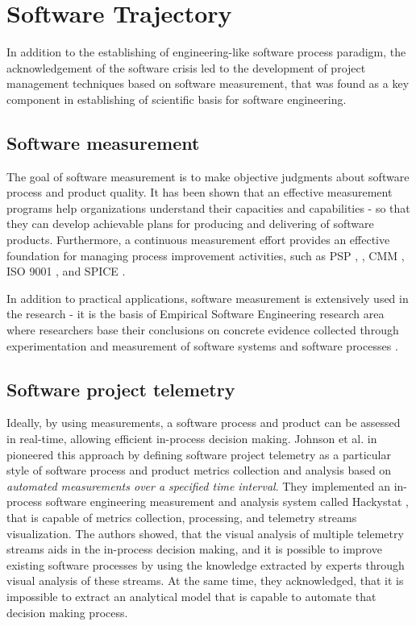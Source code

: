 %
%
\section{Software Trajectory}\label{sec_software_trajectory}
In addition to the establishing of engineering-like software process paradigm, the acknowledgement of 
the software crisis led to the development of project management techniques based on software measurement, 
that was found as a key component in establishing of scientific basis for software engineering.

\subsection{Software measurement}\label{sec_software_metrics}
The goal of software measurement is to make objective judgments about software process and product quality. 
It has been shown that an effective measurement programs help organizations understand their capacities and 
capabilities - so that they can develop achievable plans for producing and delivering of software products. 
Furthermore, a continuous measurement effort provides an effective foundation for managing process 
improvement activities, such as PSP \cite{citeulike:8347315}, \cite{citeulike:5090131} 
\cite{citeulike:12929216}, CMM \cite{citeulike:9962021}, ISO 9001 \cite{iso-standard}, 
and SPICE \cite{spice-standard}.

In addition to practical applications, software measurement is extensively used in the research - it is the basis of 
Empirical Software Engineering research area where researchers base their conclusions on concrete evidence collected 
through experimentation and measurement of software systems and software processes \cite{citeulike:766768}.

\subsection{Software project telemetry}\label{section_software_telemetry}
Ideally, by using measurements, a software process and product can be assessed in real-time, allowing efficient 
in-process decision making.
Johnson et al. in \cite{citeulike:557296} pioneered this approach by defining software project telemetry as a 
particular style of software process and product metrics collection and analysis based on 
\textit{automated measurements over a specified time interval}. 
They implemented an in-process software engineering measurement and analysis system called Hackystat 
\cite{citeulike:12929227}, that is capable of metrics collection, processing, and telemetry streams visualization. 
The authors showed, that the visual analysis of multiple telemetry streams aids in the in-process decision making, 
and it is possible to improve existing software processes by using the knowledge extracted by experts through visual 
analysis of these streams. 
At the same time, they acknowledged, that it is impossible to extract an analytical model that is capable to 
automate that decision making process.


